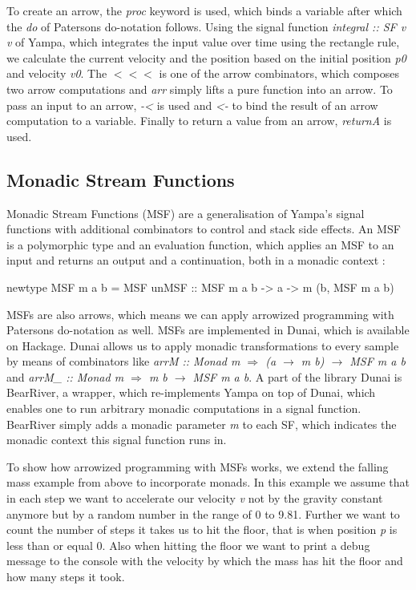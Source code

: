 To create an arrow, the \textit{proc} keyword is used, which binds a variable after which the \textit{do} of Patersons do-notation \cite{paterson_new_2001} follows. Using the signal function \textit{integral :: SF v v} of Yampa, which integrates the input value over time using the rectangle rule, we calculate the current velocity and the position based on the initial position \textit{p0} and velocity \textit{v0}. The $<<<$ is one of the arrow combinators, which composes two arrow computations and \textit{arr} simply lifts a pure function into an arrow. To pass an input to an arrow, \textit{-<} is used and \textit{<-} to bind the result of an arrow computation to a variable. Finally to return a value from an arrow, \textit{returnA} is used.

\subsection{Monadic Stream Functions}
\label{sec:back_msf}

Monadic Stream Functions (MSF) are a generalisation of Yampa's signal functions with additional combinators to control and stack side effects. An MSF is a polymorphic type and an evaluation function, which applies an MSF to an input and returns an output and a continuation, both in a monadic context \cite{perez_functional_2016}:
\begin{HaskellCode}
newtype MSF m a b = MSF {unMSF :: MSF m a b -> a -> m (b, MSF m a b)}
\end{HaskellCode}

MSFs are also arrows, which means we can apply arrowized programming with Patersons do-notation as well. MSFs are implemented in Dunai, which is available on Hackage. Dunai allows us to apply monadic transformations to every sample by means of combinators like \textit{arrM :: Monad m $\Rightarrow$ (a $\rightarrow$ m b) $\rightarrow$ MSF m a b} and \textit{arrM\_ :: Monad m $\Rightarrow$ m b $\rightarrow$ MSF m a b}. A part of the library Dunai is BearRiver, a wrapper, which re-implements Yampa on top of Dunai, which enables one to run arbitrary monadic computations in a signal function. BearRiver simply adds a monadic parameter \textit{m} to each SF, which indicates the monadic context this signal function runs in.

To show how arrowized programming with MSFs works, we extend the falling mass example from above to incorporate monads. In this example we assume that in each step we want to accelerate our velocity \textit{v} not by the gravity constant anymore but by a random number in the range of 0 to 9.81. Further we want to count the number of steps it takes us to hit the floor, that is when position \textit{p} is less than or equal 0. Also when hitting the floor we want to print a debug message to the console with the velocity by which the mass has hit the floor and how many steps it took.

